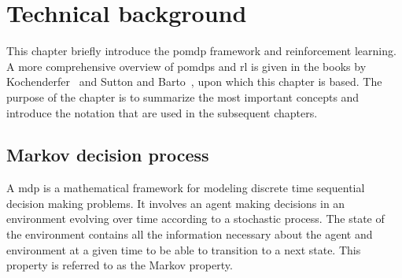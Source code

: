 \chapter{Technical background}\label{chapter:background}
This chapter briefly introduce the \gls{pomdp} framework and reinforcement learning. A more comprehensive overview of \gls{pomdp}s and \gls{rl} is given in the books by Kochenderfer~\cite{Kochenderfer2015} and Sutton and Barto~\cite{Sutton2018}, upon which this chapter is based. The purpose of the chapter is to summarize the most important concepts and introduce the notation that are used in the subsequent chapters. 

\section{Markov decision process}\label{sec:mdp}
A \gls{mdp} is a mathematical framework for modeling discrete time sequential decision making problems. It involves an agent making decisions in an environment evolving over time according to a stochastic process. The state of the environment contains all the information necessary about the agent and environment at a given time to be able to transition to a next state. This property is referred to as the Markov property. 

